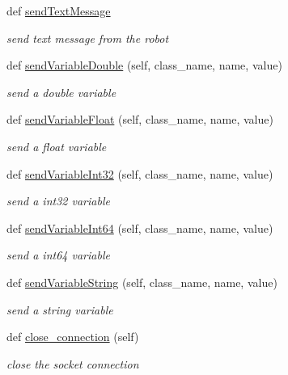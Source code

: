 \begin{DoxyCompactItemize}
def \hyperlink{classinsight__client_1_1InsightClient_a190f2cba379bef06c42094278ed13107}{send\+Text\+Message}
\begin{DoxyCompactList}\small\item\em send text message from the robot \end{DoxyCompactList}\item 
def \hyperlink{classinsight__client_1_1InsightClient_aa6b84982b43cc0b035c1a67b427b7703}{send\+Variable\+Double} (self, class\+\_\+name, name, value)
\begin{DoxyCompactList}\small\item\em send a double variable \end{DoxyCompactList}\item 
def \hyperlink{classinsight__client_1_1InsightClient_a97456977d92fa0d582f67f1bfa8fa6f2}{send\+Variable\+Float} (self, class\+\_\+name, name, value)
\begin{DoxyCompactList}\small\item\em send a float variable \end{DoxyCompactList}\item 
def \hyperlink{classinsight__client_1_1InsightClient_a4d5a78a75c245963abc551de0f00b90a}{send\+Variable\+Int32} (self, class\+\_\+name, name, value)
\begin{DoxyCompactList}\small\item\em send a int32 variable \end{DoxyCompactList}\item 
def \hyperlink{classinsight__client_1_1InsightClient_aedd06b5e19c04374d41637c84fbb2930}{send\+Variable\+Int64} (self, class\+\_\+name, name, value)
\begin{DoxyCompactList}\small\item\em send a int64 variable \end{DoxyCompactList}\item 
def \hyperlink{classinsight__client_1_1InsightClient_a6016938cd631acf9b4d28e37f2037608}{send\+Variable\+String} (self, class\+\_\+name, name, value)
\begin{DoxyCompactList}\small\item\em send a string variable \end{DoxyCompactList}\item 
def \hyperlink{classinsight__client_1_1InsightClient_a7938f9621d43eb201f6df1ef377e5544}{close\+\_\+connection} (self)
\begin{DoxyCompactList}\small\item\em close the socket connection \end{DoxyCompactList}\end{DoxyCompactItemize}
